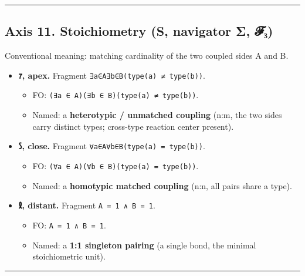 \begin{center}\rule{0.5\linewidth}{0.5pt}\end{center}

\hypertarget{axis-11.-stoichiometry-s-navigator-ux3c3-ux1d4d5ux2083}{%
\subsection{Axis 11. Stoichiometry (S, navigator Σ,
𝓕₃)}\label{axis-11.-stoichiometry-s-navigator-ux3c3-ux1d4d5ux2083}}

Conventional meaning: matching cardinality of the two coupled sides A
and B.

\begin{itemize}
\tightlist
\item
  \textbf{𐑳, apex.} Fragment \texttt{∃a∈A∃b∈B(type(a)\ ≠\ type(b))}.

  \begin{itemize}
  \tightlist
  \item
    FO: \texttt{(∃a\ ∈\ A)(∃b\ ∈\ B)(type(a)\ ≠\ type(b))}.
  \item
    Named: a \textbf{heterotypic / unmatched coupling} (n:m, the two
    sides carry distinct types; cross-type reaction center present).
  \end{itemize}
\item
  \textbf{𐑕, close.} Fragment \texttt{∀a∈A∀b∈B(type(a)\ =\ type(b))}.

  \begin{itemize}
  \tightlist
  \item
    FO: \texttt{(∀a\ ∈\ A)(∀b\ ∈\ B)(type(a)\ =\ type(b))}.
  \item
    Named: a \textbf{homotypic matched coupling} (n:n, all pairs share a
    type).
  \end{itemize}
\item
  \textbf{𐑙, distant.} Fragment
  \texttt{\textbar{}A\textbar{}\ =\ 1\ ∧\ \textbar{}B\textbar{}\ =\ 1}.

  \begin{itemize}
  \tightlist
  \item
    FO:
    \texttt{\textbar{}A\textbar{}\ =\ 1\ ∧\ \textbar{}B\textbar{}\ =\ 1}.
  \item
    Named: a \textbf{1:1 singleton pairing} (a single bond, the minimal
    stoichiometric unit).
  \end{itemize}
\end{itemize}

\begin{center}\rule{0.5\linewidth}{0.5pt}\end{center}

